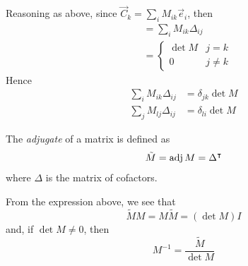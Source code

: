 \documentclass{../template/note}
\begin{document}
    Reasoning as above, since \(\vec C_k = \sum_i M_{ik} \vec e_i\), then
    \begin{align*}
        [\vec C_1, \dots, \vec C_{j-1}, \vec C_k, \vec C_{j+1}, \dots, \vec C_n] &= \sum_i M_{ik} \Delta_{ij} \\
        &= \begin{cases}
            \det M & j = k \\
            0 & j \neq k
        \end{cases}
    \end{align*}
    Hence
    \begin{align*}
        \sum_i M_{ik} \Delta_{ij} &= \delta_{jk} \det M \\
        \sum_j M_{lj} \Delta_{ij} &= \delta_{li} \det M
    \end{align*}


    \begin{definition}
        The \emph{adjugate} of a matrix is defined as
        \[
            \tilde M = \operatorname{adj} M = \Delta^\intercal
        \]
        where \(\Delta\) is the matrix of cofactors.
    \end{definition}

    \begin{proposition}
        From the expression above, we see that
        \[
            \tilde MM = M\tilde M = (\det M) I
        \]
        and, if \(\det M \neq 0\), then
        \[
            M^{-1} = \frac{\tilde M}{\det M}
        \]
    \end{proposition}
    
\end{document}
